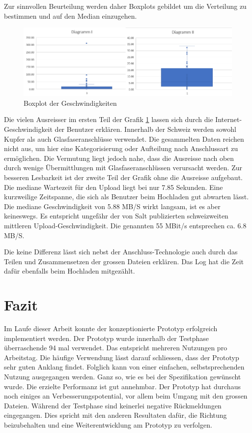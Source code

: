 Zur sinnvollen Beurteilung werden daher Boxplots gebildet um die Verteilung zu bestimmen und auf den Median einzugehen.
\begin{figure}[!h]
    \centering
    \includegraphics[width=1\linewidth]{content/images/diagramme.png}
    \caption{Boxplot der Geschwindigkeiten}
    \label{fig:diagramme}
\end{figure} 

Die vielen Ausreisser im ersten Teil der Grafik \ref{fig:diagramme} lassen sich durch die Internet-Geschwindigkeit der Benutzer erklären.
Innerhalb der Schweiz werden sowohl Kupfer als auch Glasfaseranschlüsse verwendet.
Die gesammelten Daten reichen nicht aus, um hier eine Kategorisierung oder Aufteilung nach Anschlussart zu ermöglichen.
Die Vermutung liegt jedoch nahe, dass die Ausreisse nach oben durch wenige Übermittlungen mit Glasfaseranschlüssen verursacht werden.
Zur besseren Lesbarkeit ist der zweite Teil der Grafik ohne die Ausreisse aufgebaut. 
Die mediane Wartezeit für den Upload liegt bei nur 7.85 Sekunden. Eine kurzweilige Zeitspanne, die sich als Benutzer beim Hochladen gut abwarten lässt.
Die mediane Geschwindigkeit von 5.88 MB/S wirkt langsam, ist es aber keineswegs. 
Es entspricht ungefähr der von Salt \cite{Salt} publizierten schweizweiten mittleren Upload-Geschwindigkeit. Die genannten 55 MBit/s entsprechen ca. 6.8 MB/S.

Die keine Differenz lässt sich nebst der Anschluss-Technologie auch durch das Teilen und Zusammensetzen der grossen Dateien erklären.
Das Log hat die Zeit dafür ebenfalls beim Hochladen mitgezählt. 


\section{Fazit}
Im Laufe dieser Arbeit konnte der konzeptionierte Prototyp erfolgreich implementiert werden.
Der Prototyp wurde innerhalb der Testphase überraschende 94 mal verwendet. Das entspricht mehreren Nutzungen pro Arbeitstag.
Die häufige Verwendung lässt darauf schliessen, dass der Prototyp sehr guten Anklang findet.
Folglich kann von einer einfachen, selbstsprechenden Nutzung ausgegangen werden. 
Ganz so, wie es bei der Spezifikation gewünscht wurde. Die erzielte Performanz ist gut annehmbar. 
Der Prototyp hat durchaus noch einiges an Verbesserungspotential, vor allem beim Umgang mit den grossen Dateien.
Während der Testphase sind keinerlei negative Rückmeldungen eingegangen. 
Dies spricht mit den anderen Resultaten dafür, die Richtung beizubehalten und eine Weiterentwicklung am Prototyp zu verfolgen.
